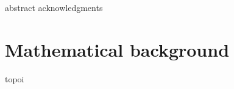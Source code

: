 \documentclass[oneside]{memoir}
\begin{document}
\frontmatter
\thetitlepage
{abstract}
{acknowledgments}
\begin{KeepFromToc} %
  \tableofcontents
\end{KeepFromToc}

\mainmatter
\part{Mathematical background}
{topoi}

\appendix
\appendixpage

\backmatter
\printbibliography
\end{document}
